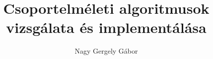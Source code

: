 \author{Nagy Gergely Gábor}
\title{Csoportelméleti algoritmusok vizsgálata és implementálása}
\date{}
\maketitle
\clearpage

